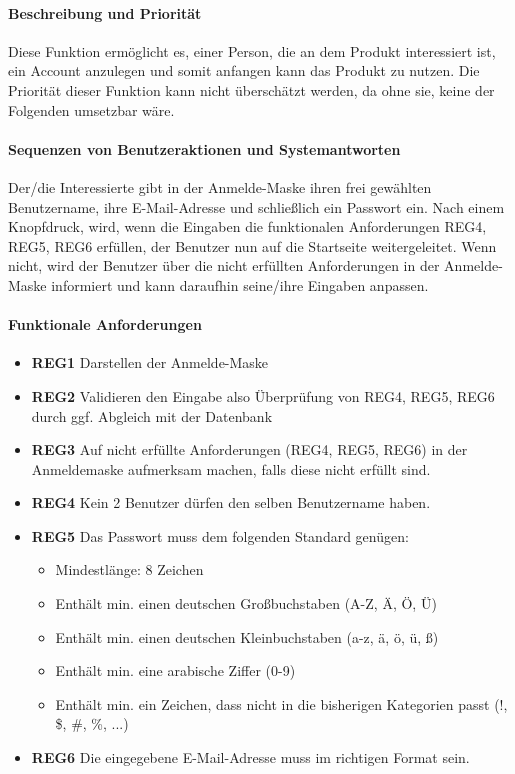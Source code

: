 \paragraph{Beschreibung und Priorität}
Diese Funktion ermöglicht es, einer Person, die an dem Produkt interessiert ist, ein Account anzulegen und somit anfangen kann das Produkt zu nutzen. Die Priorität dieser Funktion kann nicht überschätzt werden, da ohne sie, keine der Folgenden umsetzbar wäre.
\paragraph{Sequenzen von Benutzeraktionen und Systemantworten} Der/die Interessierte gibt in der Anmelde-Maske ihren frei gewählten Benutzername, ihre E-Mail-Adresse und schließlich ein Passwort ein. Nach einem Knopfdruck, wird, wenn die Eingaben die funktionalen Anforderungen REG4, REG5, REG6 erfüllen, der Benutzer nun auf die Startseite weitergeleitet. Wenn nicht, wird der Benutzer über die nicht erfüllten Anforderungen in der Anmelde-Maske informiert und kann daraufhin seine/ihre Eingaben anpassen.
\paragraph{Funktionale Anforderungen}
\begin{itemize}
	\item \textbf{REG1} Darstellen der Anmelde-Maske
	\item \textbf{REG2} Validieren den Eingabe also Überprüfung von REG4, REG5, REG6  durch ggf. Abgleich mit der Datenbank
	\item \textbf{REG3} Auf nicht erfüllte Anforderungen (REG4, REG5, REG6) in der Anmeldemaske aufmerksam machen, falls diese nicht erfüllt sind.
	\item \textbf{REG4} Kein 2 Benutzer dürfen den selben Benutzername haben.
	\item \textbf{REG5} Das Passwort muss dem folgenden Standard genügen:
	      \begin{itemize}
		      \item Mindestlänge: 8 Zeichen
		      \item Enthält min. einen deutschen Großbuchstaben (A-Z, Ä, Ö, Ü)
		      \item Enthält min. einen deutschen Kleinbuchstaben (a-z, ä, ö, ü, ß)
		      \item Enthält min. eine arabische Ziffer (0-9)
		      \item Enthält min. ein Zeichen, dass nicht in die bisherigen Kategorien passt (!, \$, \#, \%, ...)
	      \end{itemize}
	\item \textbf{REG6} Die eingegebene E-Mail-Adresse muss im richtigen Format sein.

\end{itemize}

